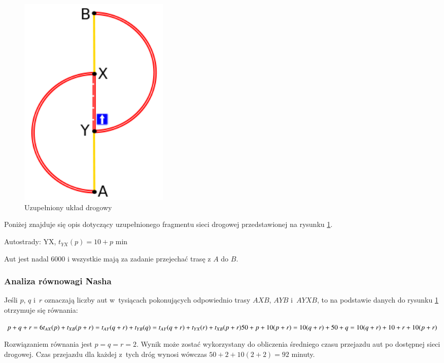 \documentclass[twoside,12pt]{report}
\begin{document}
\begin{figure}[htbp]
	\centering
	\includegraphics[width=0.35\textwidth]{img/braess2}
	\caption{Uzupełniony układ drogowy}
	\label{fig:wyjsciowy_uklad_drogowy2}
\end{figure}

Poniżej znajduje się opis dotyczący uzupełnionego fragmentu sieci drogowej przedstawionej na rysunku \ref{fig:wyjsciowy_uklad_drogowy2}.

Autostrady:\newline
YX, $t_{YX}(p) =  10 + p$ min\newline

Aut jest nadal 6000 i wszystkie mają za zadanie przejechać trasę z $A$ do $B$.

\subsubsection{Analiza równowagi Nasha}

Jeśli $p$, $q$ i~$r$ oznaczają liczby aut w~tysiącach pokonujących odpowiednio trasy $AXB$, $AYB$ i~$AYXB$, to na podstawie danych do rysunku \ref{fig:wyjsciowy_uklad_drogowy2} otrzymuje się równania:

\begin{center}
\begin{math}
p+q+r = 6 \newline
t_{AX}(p)+t_{XB}(p+r) = t_{AY}(q+r) + t_{YB}(q) = t_{AY}(q+r)+t_{YX}(r)+t_{XB}(p+r)\newline
50+p+10(p+r) = 10(q+r)+50+q = 10(q+r)+ 10 + r + 10(p+r)\newline
\end{math}
\end{center}

Rozwiązaniem równania jest $p=q=r=2$. Wynik może zostać wykorzystany do obliczenia średniego czasu przejazdu aut po dostępnej sieci drogowej. Czas przejazdu dla każdej z~tych dróg wynosi wówczas $50+2+10(2+2)=92$ minuty.
\end{document}
